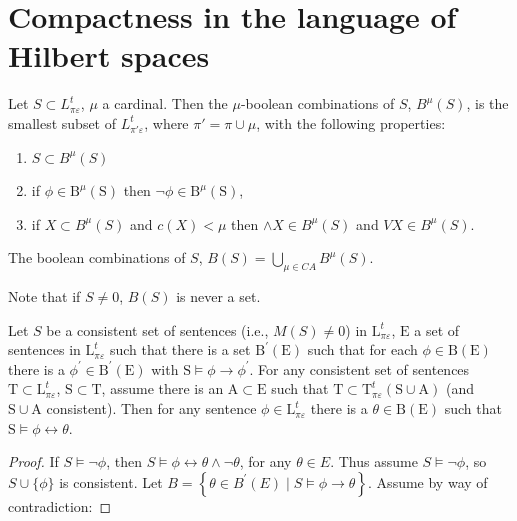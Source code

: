 \documentclass{article}
\begin{document}
{{{\section{Compactness in the language of Hilbert spaces}
\begin{definition}
Let $S \subset L_{\pi \varepsilon}^{t}$, $\mu$ a cardinal. Then the $\mu$-boolean combinations of $S$, $B^{\mu}(S)$, is the smallest subset of $L_{\pi' \varepsilon}^{t}$, where $\pi'=\pi \cup \mu$, with the following properties:
\begin{enumerate}
\item $S \subset B^{\mu}(S)$
\item if $\phi \in \mathrm{B}^{\mu}(\mathrm{S})$ then $\neg \phi \in \mathrm{B}^{\mu}(\mathrm{S})$,
\item if $X \subset B^{\mu}(S)$ and $c(X)<\mu$ then $\wedge X \in B^{\mu}(S)$ and $V X \in B^{\mu}(S)$.
\end{enumerate}
The boolean combinations of $S$, $B(S)=\bigcup_{\mu \in C A} B^{\mu}(S)$.
\end{definition}
Note that if $S \neq 0$, $B(S)$ is never a set.
\begin{theorem}
Let $S$ be a consistent set of sentences (i.e., $M(S) \neq 0$) in $\mathrm{L}_{\pi \varepsilon}^{t}$, $\mathrm{E}$ a set of sentences in $\mathrm{L}_{\pi \varepsilon}^{t}$ such that there is a set $\mathrm{B}^{\prime}(\mathrm{E})$ such that for each $\phi \in \mathrm{B}(\mathrm{E})$ there is a $\phi^{\prime} \in \mathrm{B}^{\prime}(\mathrm{E})$ with $\mathrm{S} \vDash \phi \rightarrow \phi^{\prime}$. For any consistent set of sentences $\mathrm{T} \subset \mathrm{L}_{\pi \varepsilon}^{t}$, $\mathrm{S} \subset \mathrm{T}$, assume there is an $\mathrm{A} \subset \mathrm{E}$ such that $\mathrm{T} \subset \mathrm{T}_{\pi \varepsilon}^{t}(\mathrm{S} \cup \mathrm{A})$ (and $\mathrm{S} \cup \mathrm{A}$ consistent). Then for any sentence $\phi \in \mathrm{L}_{\pi \varepsilon}^{t}$ there is a $\theta \in \mathrm{B}(\mathrm{E})$ such that $\mathrm{S} \vDash \phi \leftrightarrow \theta$.
\end{theorem}
\begin{proof}
If $S \vDash \neg \phi$, then $S \vDash \phi \leftrightarrow \theta \wedge \neg \theta$, for any $\theta \in E$. Thus assume $S \vDash \neg \phi$, so $S \cup \{\phi\}$ is consistent. Let $B=\left\{\theta \in B^{\prime}(E) \mid S \vDash \phi \rightarrow \theta\right\}$. Assume by way of contradiction:

\end{proof}}}}
\end{document}

